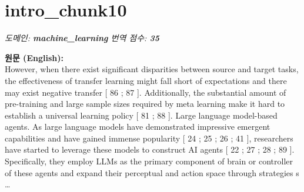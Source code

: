 \documentclass[12pt,a4paper]{article}
\begin{document}
\section{intro\_chunk10}
\noindent\textit{\small 도메인: \textbf{machine\_learning} \quad 번역 점수: \textbf{\color{red!70!black}35}}
\vspace{0.5em}

\begin{mdframed}[style=orig]
\noindent\textbf{\small 원문 (English):}\\[2pt]
\small However, when there exist significant disparities between source and target tasks, the effectiveness of transfer learning might fall short of expectations and there may exist negative transfer [ 86 ; 87 ]. Additionally, the substantial amount of pre-training and large sample sizes required by meta learning make it hard to establish a universal learning policy [ 81 ; 88 ]. Large language model-based agents. As large language models have demonstrated impressive emergent capabilities and have gained immense popularity [ 24 ; 25 ; 26 ; 41 ], researchers have started to leverage these models to construct AI agents [ 22 ; 27 ; 28 ; 89 ]. Specifically, they employ LLMs as the primary component of brain or controller of these agents and expand their perceptual and action space through strategies s \ldots
\end{mdframed}
\vspace{0.4em}
\end{document}
